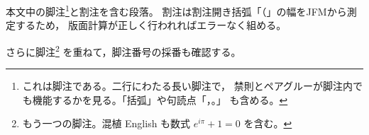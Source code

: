 \documentclass[pdflatex]{jlreq}
\begin{document}
本文中の脚注\footnote{これは脚注である。二行にわたる長い脚注で，
禁則とペアグルーが脚注内でも機能するかを見る。「括弧」や句読点「，。」
も含める。}と割注を含む段落。
割注は割注開き括弧「（」の幅をJFMから測定するため，
版面計算が正しく行われればエラーなく組める。

さらに脚注\footnote{もう一つの脚注。混植 English も数式 $e^{i\pi}+1=0$ を含む。}
を重ねて，脚注番号の採番も確認する。
\end{document}

